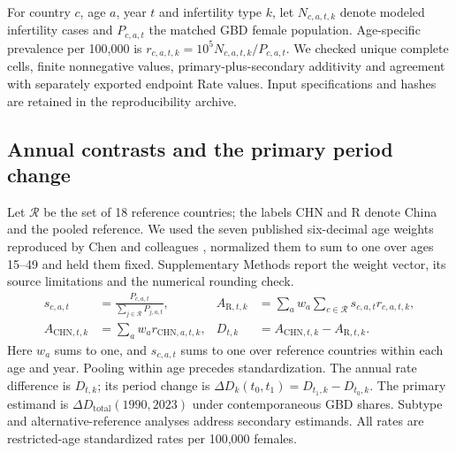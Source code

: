 \documentclass[11pt,a4paper]{article}
\begin{document}
For country $c$, age $a$, year $t$ and infertility type $k$, let $N_{c,a,t,k}$ denote modeled infertility cases and $P_{c,a,t}$ the matched GBD female population. Age-specific prevalence per 100,000 is $r_{c,a,t,k}=10^5N_{c,a,t,k}/P_{c,a,t}$. We checked unique complete cells, finite nonnegative values, primary-plus-secondary additivity and agreement with separately exported endpoint Rate values. Input specifications and hashes are retained in the reproducibility archive.

\subsection{Annual contrasts and the primary period change}
Let $\mathcal{R}$ be the set of 18 reference countries; the labels $\mathrm{CHN}$ and $\mathrm{R}$ denote China and the pooled reference. We used the seven published six-decimal age weights reproduced by Chen and colleagues \citep{chen}, normalized them to sum to one over ages 15--49 and held them fixed. Supplementary Methods report the weight vector, its source limitations and the numerical rounding check.
\begin{align}
 s_{c,a,t}&=\frac{P_{c,a,t}}{\sum_{j\in\mathcal{R}}P_{j,a,t}}, &
 A_{\mathrm{R},t,k}&=\sum_a w_a\sum_{c\in\mathcal{R}}s_{c,a,t}r_{c,a,t,k},\\
 A_{\mathrm{CHN},t,k}&=\sum_a w_ar_{\mathrm{CHN},a,t,k}, &
 D_{t,k}&=A_{\mathrm{CHN},t,k}-A_{\mathrm{R},t,k}.
\end{align}
Here $w_a$ sums to one, and $s_{c,a,t}$ sums to one over reference countries within each age and year. Pooling within age precedes standardization. The annual rate difference is $D_{t,k}$; its period change is $\Delta D_k(t_0,t_1)=D_{t_1,k}-D_{t_0,k}$. The primary estimand is $\Delta D_{\mathrm{total}}(1990,2023)$ under contemporaneous GBD shares. Subtype and alternative-reference analyses address secondary estimands. All rates are restricted-age standardized rates per 100,000 females.
\end{document}
